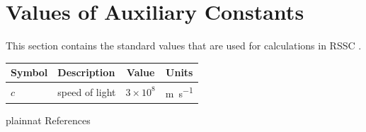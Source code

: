 \documentclass[12pt]{article}
\begin{document}



\section{Values of Auxiliary Constants}

This section contains the standard values that are used for calculations in RSSC
.
\begin{table}[!h]
\renewcommand{\arraystretch}{1.2}
\noindent \begin{longtable*}{l l c c} 
  \toprule
  \textbf{Symbol} & \textbf{Description} & \textbf{Value} & \textbf{Units}\\
  \midrule 
  $c$ & speed of light & $3\times 10^8$ & \si{\metre\per\s}\\
  \bottomrule
\end{longtable*}
\label{Constant}
\end{table}



\newpage
 {plainnat}
 {References}
\end{document}
